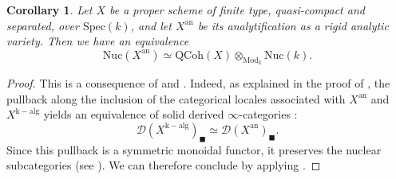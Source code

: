 \documentclass[oneside, hidelinks, 12pt, a4paper,reqno]{amsart}
\theoremstyle{plain}
\theoremstyle{definition}
\newtheorem{definition}[definition]{Definition}
\newtheorem{remark}[remark]{Remark}
\theoremstyle{plain}
\newtheorem{corollary}[corollary]{Corollary}
\newcommand{\cD}{\mathscr D}
\newcommand{\Spec}{\mathrm{Spec}}
\newcommand{\cates}{$\infty$-categories }
\newcommand{\Nuc}{\mathrm{Nuc}}
\newcommand{\Qcoh}{\mathrm{QCoh}}
\newcommand{\Mod}{\mathrm{Mod}}
\newcommand{\Solid}{\blacksquare}
\begin{document}
\begin{corollary}\label{cor: GAGA for nuclear categories}
    Let $X$ be a proper scheme of finite type, quasi-compact and separated, over $\Spec(k)$, and let $X^{\mathrm{an}}$ be its analytification as a rigid analytic variety. Then we have an equivalence 
    \[
    \Nuc(X^{\mathrm{an}}) \simeq \Qcoh(X) \otimes_{\Mod_{k}} \Nuc(k).
    \]
\end{corollary}
\begin{proof}
    This is a consequence of \cite[Theorem 4.1.1]{wang2026relativegagatheoremapplication} and . Indeed, as explained in the proof of \cite[Theorem 4.1.1]{wang2026relativegagatheoremapplication}, the pullback along the inclusion of the categorical locales associated with $X^{\mathrm{an}}$ and $X^{\mathrm{k-alg}}$ yields an equivalence of solid derived \cates:
    \[
    \cD(X^{\mathrm{k-alg}})_\Solid \simeq \cD(X^{\mathrm{an}})_\Solid.
    \]
    Since this pullback is a symmetric monoidal functor, it preserves the nuclear subcategories (see \cite[Theorem 2.4 (c)]{meyer2025qhodgecomplexesrefinedoperatornametc}). We can therefore conclude by applying .
\end{proof}

\end{document}
